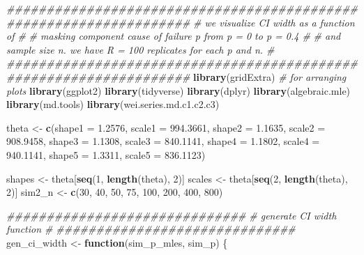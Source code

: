\documentclass[
]{article}
\newenvironment{Shaded}{\begin{snugshade}}{\end{snugshade}}
\newcommand{\CommentTok}[1]{\textcolor[rgb]{0.56,0.35,0.01}{\textit{#1}}}
\newcommand{\ControlFlowTok}[1]{\textcolor[rgb]{0.13,0.29,0.53}{\textbf{#1}}}
\newcommand{\DataTypeTok}[1]{\textcolor[rgb]{0.13,0.29,0.53}{#1}}
\newcommand{\DecValTok}[1]{\textcolor[rgb]{0.00,0.00,0.81}{#1}}
\newcommand{\FloatTok}[1]{\textcolor[rgb]{0.00,0.00,0.81}{#1}}
\newcommand{\KeywordTok}[1]{\textcolor[rgb]{0.13,0.29,0.53}{\textbf{#1}}}
\newcommand{\NormalTok}[1]{#1}
\newcommand{\StringTok}[1]{\textcolor[rgb]{0.31,0.60,0.02}{#1}}
\begin{document}
\begin{Shaded}
\begin{Highlighting}[]
\CommentTok{\#\#\#\#\#\#\#\#\#\#\#\#\#\#\#\#\#\#\#\#\#\#\#\#\#\#\#\#\#\#\#\#\#\#\#\#\#\#\#\#\#\#\#\#\#\#\#\#\#\#\#\#\#\#\#\#\#\#\#\#\#\#\#\#\#\#\#}
\CommentTok{\# we visualize CI width as a function of                          \#}
\CommentTok{\# masking component cause of failure p from p = 0 to p = 0.4      \#}
\CommentTok{\# and sample size n. we have R = 100 replicates for each p and n. \#}
\CommentTok{\#\#\#\#\#\#\#\#\#\#\#\#\#\#\#\#\#\#\#\#\#\#\#\#\#\#\#\#\#\#\#\#\#\#\#\#\#\#\#\#\#\#\#\#\#\#\#\#\#\#\#\#\#\#\#\#\#\#\#\#\#\#\#\#\#\#\#}
\KeywordTok{library}\NormalTok{(gridExtra)  }\CommentTok{\# for arranging plots}
\KeywordTok{library}\NormalTok{(ggplot2)}
\KeywordTok{library}\NormalTok{(tidyverse)}
\KeywordTok{library}\NormalTok{(dplyr)}
\KeywordTok{library}\NormalTok{(algebraic.mle)}
\KeywordTok{library}\NormalTok{(md.tools)}
\KeywordTok{library}\NormalTok{(wei.series.md.c1.c2.c3)}

\NormalTok{theta \textless{}{-}}\StringTok{ }\KeywordTok{c}\NormalTok{(}\DataTypeTok{shape1 =} \FloatTok{1.2576}\NormalTok{, }\DataTypeTok{scale1 =} \FloatTok{994.3661}\NormalTok{,}
           \DataTypeTok{shape2 =} \FloatTok{1.1635}\NormalTok{, }\DataTypeTok{scale2 =} \FloatTok{908.9458}\NormalTok{,}
           \DataTypeTok{shape3 =} \FloatTok{1.1308}\NormalTok{, }\DataTypeTok{scale3 =} \FloatTok{840.1141}\NormalTok{,}
           \DataTypeTok{shape4 =} \FloatTok{1.1802}\NormalTok{, }\DataTypeTok{scale4 =} \FloatTok{940.1141}\NormalTok{,}
           \DataTypeTok{shape5 =} \FloatTok{1.3311}\NormalTok{, }\DataTypeTok{scale5 =} \FloatTok{836.1123}\NormalTok{)}

\NormalTok{shapes \textless{}{-}}\StringTok{ }\NormalTok{theta[}\KeywordTok{seq}\NormalTok{(}\DecValTok{1}\NormalTok{, }\KeywordTok{length}\NormalTok{(theta), }\DecValTok{2}\NormalTok{)]}
\NormalTok{scales \textless{}{-}}\StringTok{ }\NormalTok{theta[}\KeywordTok{seq}\NormalTok{(}\DecValTok{2}\NormalTok{, }\KeywordTok{length}\NormalTok{(theta), }\DecValTok{2}\NormalTok{)]}
\NormalTok{sim2\_n \textless{}{-}}\StringTok{ }\KeywordTok{c}\NormalTok{(}\DecValTok{30}\NormalTok{, }\DecValTok{40}\NormalTok{, }\DecValTok{50}\NormalTok{, }\DecValTok{75}\NormalTok{, }\DecValTok{100}\NormalTok{, }\DecValTok{200}\NormalTok{, }\DecValTok{400}\NormalTok{, }\DecValTok{800}\NormalTok{)}

\CommentTok{\#\#\#\#\#\#\#\#\#\#\#\#\#\#\#\#\#\#\#\#\#\#\#\#\#\#\#\#\#\#}
\CommentTok{\# generate CI width function \#}
\CommentTok{\#\#\#\#\#\#\#\#\#\#\#\#\#\#\#\#\#\#\#\#\#\#\#\#\#\#\#\#\#\#}
\NormalTok{gen\_ci\_width \textless{}{-}}\StringTok{ }\ControlFlowTok{function}\NormalTok{(sim\_p\_mles, sim\_p) \{}


\end{Highlighting}
\end{Shaded}
\end{document}
